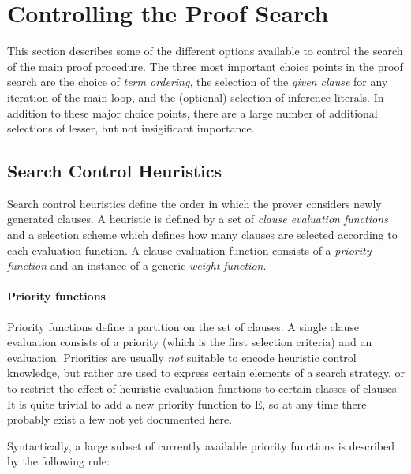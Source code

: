 \documentclass{report}
\begin{document}
\chapter{Controlling the Proof Search}
\label{sec:options}

This section describes some of the different options available to
control the search of the main proof procedure. The three most
important choice points in the proof search are the choice of
\emph{term ordering}, the selection of the
\emph{given clause} for any iteration of the main
loop, and the (optional) selection of inference
literals. In addition to these major choice
points, there are a large number of additional selections of lesser,
but not insigificant importance.


\section{Search Control Heuristics}
\label{sec:options:heuristics}

Search control heuristics define the order in which the prover
considers newly generated clauses. A heuristic is defined by a set of
\emph{clause evaluation functions} and a selection scheme which defines
how many clauses are selected according to each evaluation function. A
clause evaluation function consists of a \emph{priority function} and
an instance of a generic \emph{weight function}.

\subsubsection{Priority functions}

Priority functions define a partition on the set of clauses.  A single
clause evaluation consists of a priority (which is the first selection
criteria) and an evaluation. Priorities are usually \emph{not}
suitable to encode heuristic control knowledge, but rather are used to
express certain elements of a search strategy, or to restrict the
effect of heuristic evaluation functions to certain classes of
clauses. It is quite trivial to add a new priority function to E, so
at any time there probably exist a few not yet documented here.

Syntactically, a large subset of currently available priority
functions is described by the following rule:
\end{document}

